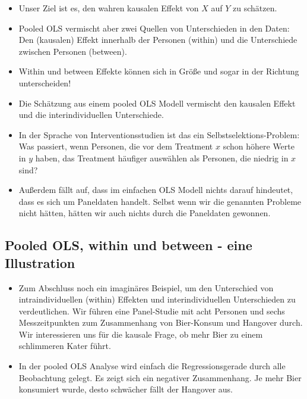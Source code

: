 \documentclass[
]{book}
\providecommand{\tightlist}{%
  \setlength{\itemsep}{0pt}\setlength{\parskip}{0pt}}
\begin{document}
\begin{itemize}
\tightlist
\item
  Unser Ziel ist es, den wahren kausalen Effekt von \(X\) auf \(Y\) zu schätzen.
\item
  Pooled OLS vermischt aber zwei Quellen von Unterschieden in den Daten: Den (kausalen) Effekt innerhalb der Personen (within) und die Unterschiede zwischen Personen (between).
\item
  Within und between Effekte können sich in Größe und sogar in der Richtung unterscheiden!
\item
  Die Schätzung aus einem pooled OLS Modell vermischt den kausalen Effekt und die interindividuellen Unterschiede.
\item
  In der Sprache von Interventionsstudien ist das ein Selbstselektions-Problem: Was passiert, wenn Personen, die vor dem Treatment \(x\) schon höhere Werte in \(y\) haben, das Treatment häufiger auswählen als Personen, die niedrig in \(x\) sind?
\item
  Außerdem fällt auf, dass im einfachen OLS Modell nichts darauf hindeutet, dass es sich um Paneldaten handelt. Selbst wenn wir die genannten Probleme nicht hätten, hätten wir auch nichts durch die Paneldaten gewonnen.
\end{itemize}

\hypertarget{pooled-ols-within-und-between---eine-illustration}{%
\subsection*{Pooled OLS, within und between - eine Illustration}\label{pooled-ols-within-und-between---eine-illustration}}

\begin{itemize}
\item
  Zum Abschluss noch ein imaginäres Beispiel, um den Unterschied von intraindividuellen (within) Effekten und interindividuellen Unterschieden zu verdeutlichen. Wir führen eine Panel-Studie mit acht Personen und sechs Messzeitpunkten zum Zusammenhang von Bier-Konsum und Hangover durch. Wir interessieren uns für die kausale Frage, ob mehr Bier zu einem schlimmeren Kater führt.
\item
  In der pooled OLS Analyse wird einfach die Regressionsgerade durch alle Beobachtung gelegt. Es zeigt sich ein negativer Zusammenhang. Je mehr Bier konsumiert wurde, desto schwächer fällt der Hangover aus.
\end{itemize}
\end{document}
